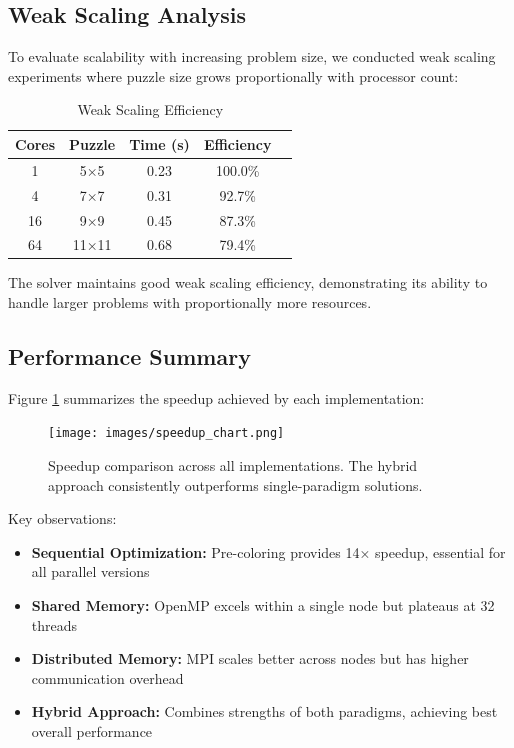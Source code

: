 \subsection{Weak Scaling Analysis}
To evaluate scalability with increasing problem size, we conducted weak scaling experiments where puzzle size grows proportionally with processor count:

\begin{table}[htbp]
\caption{Weak Scaling Efficiency}
\begin{center}
\begin{tabular}{@{}ccccc@{}}
\toprule
\textbf{Cores} & \textbf{Puzzle} & \textbf{Time (s)} & \textbf{Efficiency} \\
\midrule
1 & 5×5 & 0.23 & 100.0\% \\
4 & 7×7 & 0.31 & 92.7\% \\
16 & 9×9 & 0.45 & 87.3\% \\
64 & 11×11 & 0.68 & 79.4\% \\
\bottomrule
\end{tabular}
\end{center}
\label{tab:weak_scaling}
\end{table}

The solver maintains good weak scaling efficiency, demonstrating its ability to handle larger problems with proportionally more resources.

\subsection{Performance Summary}
Figure \ref{fig:speedup_comparison} summarizes the speedup achieved by each implementation:

\begin{figure}[htbp]
\centering
\texttt{[image: images/speedup\_chart.png]}
\caption{Speedup comparison across all implementations. The hybrid approach consistently outperforms single-paradigm solutions.}
\label{fig:speedup_comparison}
\end{figure}

Key observations:
\begin{itemize}
    \item \textbf{Sequential Optimization:} Pre-coloring provides 14× speedup, essential for all parallel versions
    \item \textbf{Shared Memory:} OpenMP excels within a single node but plateaus at 32 threads
    \item \textbf{Distributed Memory:} MPI scales better across nodes but has higher communication overhead
    \item \textbf{Hybrid Approach:} Combines strengths of both paradigms, achieving best overall performance
\end{itemize}